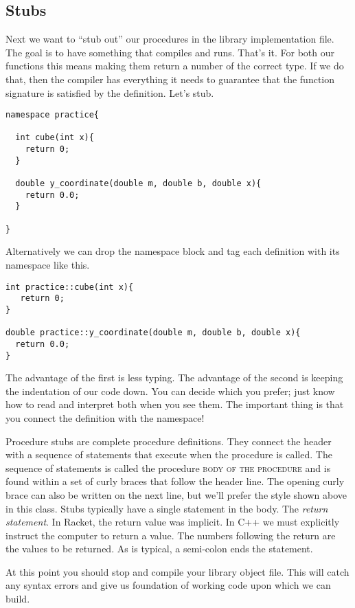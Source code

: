 \documentclass[]{tufte-handout}
\begin{document}
\subsection{Stubs}

Next we want to ``stub out'' our procedures in the library implementation file. The goal is to have something that compiles and runs. That's it.  For both our functions this means making them return a number of the correct type. If we do that, then the compiler has everything it needs to guarantee that the function signature is satisfied by the definition.  Let's stub.

\begin{verbatim}
namespace practice{

  int cube(int x){
    return 0;  
  }

  double y_coordinate(double m, double b, double x){
    return 0.0;
  }

}
\end{verbatim}

Alternatively we can drop the namespace block and tag each definition with its namespace like this.
\begin{verbatim}
int practice::cube(int x){
   return 0;  
}

double practice::y_coordinate(double m, double b, double x){
  return 0.0;
}
\end{verbatim}
The advantage of the first is less typing. The advantage of the second is keeping the indentation of our code down.  You can decide which you prefer; just know how to read and interpret both when you see them. The important thing is that you connect the definition with the namespace!

Procedure stubs are complete procedure definitions. They connect the header with a sequence of statements that execute when the procedure is called. The sequence of statements is called the procedure  \textsc{body of the procedure} and is found within a set of curly braces that follow the header line. The opening curly brace can also be written on the next line, but we'll prefer the style shown above in this class.  Stubs typically have a single statement in the body. The \textit{return statement}. In Racket, the return value was implicit. In C++ we must explicitly instruct the computer to return a value. The numbers following the return are the values to be returned. As is typical, a semi-colon ends the statement. 

At this point you should stop and compile your library object file. This will catch any syntax errors and give us foundation of working code upon which we can build. 
\end{document}
